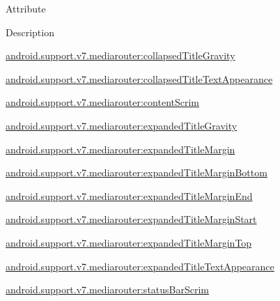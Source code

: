 Attribute

Description 

{\ttfamily \hyperlink{classandroid_1_1support_1_1v7_1_1mediarouter_1_1R_1_1styleable_a4796c2b434065ed0a5d8b8da7097611f}{android.\+support.\+v7.\+mediarouter\+:collapsed\+Title\+Gravity}}

{\ttfamily \hyperlink{classandroid_1_1support_1_1v7_1_1mediarouter_1_1R_1_1styleable_a19289097d1a4df77e8a7e6951eca7f63}{android.\+support.\+v7.\+mediarouter\+:collapsed\+Title\+Text\+Appearance}}

{\ttfamily \hyperlink{classandroid_1_1support_1_1v7_1_1mediarouter_1_1R_1_1styleable_a733f927a6b32c7e392024dee4d4567eb}{android.\+support.\+v7.\+mediarouter\+:content\+Scrim}}

{\ttfamily \hyperlink{classandroid_1_1support_1_1v7_1_1mediarouter_1_1R_1_1styleable_ae40ceb21ca3985d085331f3239b64f89}{android.\+support.\+v7.\+mediarouter\+:expanded\+Title\+Gravity}}

{\ttfamily \hyperlink{classandroid_1_1support_1_1v7_1_1mediarouter_1_1R_1_1styleable_ac9af9dc4bdced732d343d68c26940f9e}{android.\+support.\+v7.\+mediarouter\+:expanded\+Title\+Margin}}

{\ttfamily \hyperlink{classandroid_1_1support_1_1v7_1_1mediarouter_1_1R_1_1styleable_ac08783d2f2f6cd0a8b8e66d9fc4f7c4c}{android.\+support.\+v7.\+mediarouter\+:expanded\+Title\+Margin\+Bottom}}

{\ttfamily \hyperlink{classandroid_1_1support_1_1v7_1_1mediarouter_1_1R_1_1styleable_a99ffdbdeb16dfbadacaf7acae56a72e8}{android.\+support.\+v7.\+mediarouter\+:expanded\+Title\+Margin\+End}}

{\ttfamily \hyperlink{classandroid_1_1support_1_1v7_1_1mediarouter_1_1R_1_1styleable_a59b6f64edf96c1e41a735bced54430bd}{android.\+support.\+v7.\+mediarouter\+:expanded\+Title\+Margin\+Start}}

{\ttfamily \hyperlink{classandroid_1_1support_1_1v7_1_1mediarouter_1_1R_1_1styleable_ab761558efd3406c65c9f69c800bfca94}{android.\+support.\+v7.\+mediarouter\+:expanded\+Title\+Margin\+Top}}

{\ttfamily \hyperlink{classandroid_1_1support_1_1v7_1_1mediarouter_1_1R_1_1styleable_a9562f47ec6ef350bc545bf9a99118b33}{android.\+support.\+v7.\+mediarouter\+:expanded\+Title\+Text\+Appearance}}

{\ttfamily \hyperlink{classandroid_1_1support_1_1v7_1_1mediarouter_1_1R_1_1styleable_a33838f98949a195055bcd027fb0c8e1c}{android.\+support.\+v7.\+mediarouter\+:status\+Bar\+Scrim}}

